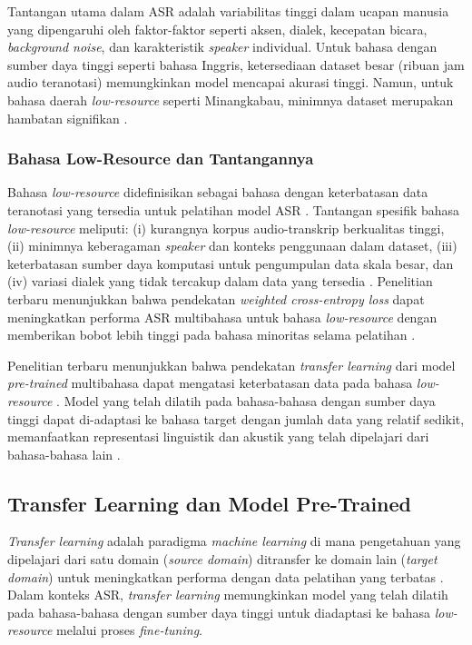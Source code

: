Tantangan utama dalam ASR adalah variabilitas tinggi dalam ucapan manusia yang dipengaruhi oleh faktor-faktor seperti aksen, dialek, kecepatan bicara, \textit{background noise}, dan karakteristik \textit{speaker} individual. Untuk bahasa dengan sumber daya tinggi seperti bahasa Inggris, ketersediaan dataset besar (ribuan jam audio teranotasi) memungkinkan model mencapai akurasi tinggi. Namun, untuk bahasa daerah \textit{low-resource} seperti Minangkabau, minimnya dataset merupakan hambatan signifikan \cite{liu2024exploration}.

\subsubsection{Bahasa Low-Resource dan Tantangannya}

Bahasa \textit{low-resource} didefinisikan sebagai bahasa dengan keterbatasan data teranotasi yang tersedia untuk pelatihan model ASR \cite{liang2025fieldmatters}. Tantangan spesifik bahasa \textit{low-resource} meliputi: (i) kurangnya korpus audio-transkrip berkualitas tinggi, (ii) minimnya keberagaman \textit{speaker} dan konteks penggunaan dalam dataset, (iii) keterbatasan sumber daya komputasi untuk pengumpulan data skala besar, dan (iv) variasi dialek yang tidak tercakup dalam data yang tersedia \cite{timmel2024finetune,gete2025whispering}. Penelitian terbaru menunjukkan bahwa pendekatan \textit{weighted cross-entropy loss} dapat meningkatkan performa ASR multibahasa untuk bahasa \textit{low-resource} dengan memberikan bobot lebih tinggi pada bahasa minoritas selama pelatihan \cite{pineiromartin2024weighted}.

Penelitian terbaru menunjukkan bahwa pendekatan \textit{transfer learning} dari model \textit{pre-trained} multibahasa dapat mengatasi keterbatasan data pada bahasa \textit{low-resource} \cite{arisaputra2022xlsr53,li2024improving,gete2025whispering}. Model yang telah dilatih pada bahasa-bahasa dengan sumber daya tinggi dapat di-adaptasi ke bahasa target dengan jumlah data yang relatif sedikit, memanfaatkan representasi linguistik dan akustik yang telah dipelajari dari bahasa-bahasa lain \cite{conneau2020unsupervised}.

\subsection{Transfer Learning dan Model Pre-Trained}
\label{II.TransferLearning}

\textit{Transfer learning} adalah paradigma \textit{machine learning} di mana pengetahuan yang dipelajari dari satu domain (\textit{source domain}) ditransfer ke domain lain (\textit{target domain}) untuk meningkatkan performa dengan data pelatihan yang terbatas \cite{pan2010transfer}. Dalam konteks ASR, \textit{transfer learning} memungkinkan model yang telah dilatih pada bahasa-bahasa dengan sumber daya tinggi untuk diadaptasi ke bahasa \textit{low-resource} melalui proses \textit{fine-tuning}.

